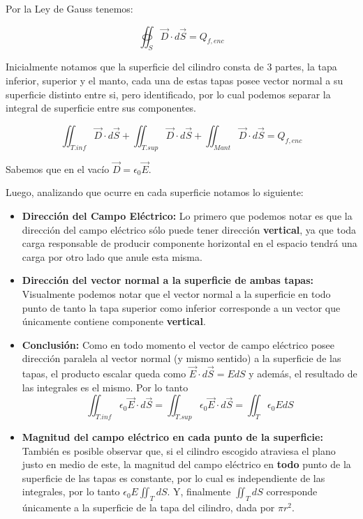 \documentclass[11pt]{article}
\begin{document}
\begin{solucion}
    Por la Ley de Gauss tenemos:

    \begin{equation}
        \oiint_S \vec{D}\cdot d\vec{S} = Q_{f, enc}
    \end{equation}

    Inicialmente notamos que la superficie del cilindro consta de 3 partes, la tapa inferior, superior y el manto, cada una de estas tapas posee vector normal a su superficie distinto entre si, pero identificado, por lo cual podemos separar la integral de superficie entre sus componentes.

    \begin{equation}
        \iint_{T. inf} \vec{D} \cdot d\vec{S} + \iint_{T. sup} \vec{D} \cdot d\vec{S} + \iint_{Mant} \vec{D} \cdot d\vec{S} = Q_{f, enc}
    \end{equation}

    Sabemos que en el vacío $\vec{D}=\epsilon_0\vec{E}$.

    Luego, analizando que ocurre en cada superficie notamos lo siguiente:

    \begin{itemize}
        \item \textbf{Dirección del Campo Eléctrico:} Lo primero que podemos notar es que la dirección del campo eléctrico sólo puede tener dirección \textbf{vertical}, ya que toda carga responsable de producir componente horizontal en el espacio tendrá una carga por otro lado que anule esta misma.
        \item \textbf{Dirección del vector normal a la superficie de ambas tapas:} Visualmente podemos notar que el vector normal a la superficie en todo punto de tanto la tapa superior como inferior corresponde a un vector que únicamente contiene componente \textbf{vertical}.
        \item \textbf{Conclusión:} Como en todo momento el vector de campo eléctrico posee dirección paralela al vector normal (y mismo sentido) a la superficie de las tapas, el producto escalar queda como $\vec{E}\cdot d\vec{S} = EdS$ y además, el resultado de las integrales es el mismo. Por lo tanto
              \begin{equation}
                  \iint_{T.inf}\epsilon_0\vec{E}\cdot d\vec{S} = \iint_{T.sup}\epsilon_0\vec{E}\cdot d\vec{S} = \iint_{T}\epsilon_0EdS
              \end{equation}
        \item \textbf{Magnitud del campo eléctrico en cada punto de la superficie:} También es posible observar que, si el cilindro escogido atraviesa el plano justo en medio de este, la magnitud del campo eléctrico en \textbf{todo} punto de la superficie de las tapas es constante, por lo cual es independiente de las integrales, por lo tanto $\epsilon_0E \iint_{T}dS$. Y, finalmente $\iint_{T}dS$ corresponde únicamente a la superficie de la tapa del cilindro, dada por $\pi r^2$.
    \end{itemize}


\end{solucion}
\end{document}
